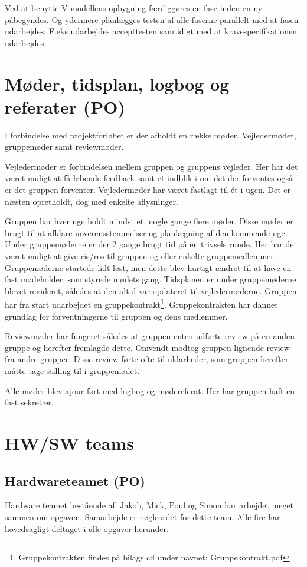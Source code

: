Ved at benytte V-modellens opbygning færdiggøres en fase inden en ny påbegyndes. Og ydermere planlægges testen af alle faserne parallelt med at fasen udarbejdes. F.eks udarbejdes accepttesten samtidigt med at kravespecifikationen udarbejdes.  

\section{Møder, tidsplan, logbog og referater (PO)}

I forbindelse med projektforløbet er der afholdt en række møder. Vejledermøder, gruppemøder samt reviewmøder.

Vejledermøder er forbindelsen mellem gruppen og gruppens vejleder. Her har det været muligt at få løbende feedback samt et indblik i om det der forventes også er det gruppen forventer. Vejledermøder har været fastlagt til ét i ugen. Det er næsten opretholdt, dog med enkelte aflysninger.

Gruppen har hver uge holdt mindst et, nogle gange flere møder. Disse møder er brugt til at afklare uoverensstemmelser og planlægning af den kommende uge. Under gruppemøderne er der 2 gange brugt tid på en trivsels runde. Her har det været muligt at give ris/ros til gruppen og eller enkelte gruppemedlemmer. Gruppemøderne startede lidt løst, men dette blev hurtigt ændret til at have en fast mødeholder, som styrede mødets gang. Tidsplanen er under gruppemøderne blevet revideret, således at den altid var opdateret til vejledermøderne. Gruppen har fra start udarbejdet en gruppekontrakt\footnote{Gruppekontrakten findes på bilags cd under navnet: Gruppekontrakt.pdf}. Gruppekontrakten har dannet grundlag for forventningerne til gruppen og dens medlemmer.

Reviewmøder har fungeret således at gruppen enten udførte review på en anden gruppe og herefter fremlagde dette. Omvendt modtog gruppen lignende review fra andre grupper. Disse review førte ofte til uklarheder, som gruppen herefter måtte tage stilling til i gruppemødet.

Alle møder blev ajour-ført med logbog og mødereferat. Her har gruppen haft en fast sekretær. 

\section{HW/SW teams}

\subsection{Hardwareteamet (PO)}
Hardware teamet bestående af: Jakob, Mick, Poul og Simon har arbejdet meget sammen om opgaven. Samarbejde er nøgleordet for dette team. Alle fire har hovedsagligt deltaget i alle opgaver herunder.  

